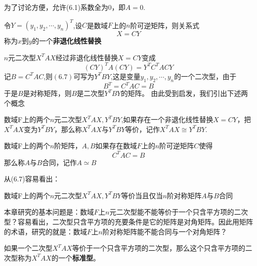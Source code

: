 \documentclass[lang=cn,10pt]{elegantbook}
\begin{document}
为了讨论方便，允许(6.1)系数全为0，即$A=0$.

令$Y=(y_{1},y_{2},\cdots,y_{n})^{T}$,设$C$是数域$F$上的$n$阶可逆矩阵，则关系式
\begin{equation}
	X=CY
\end{equation}
称为$x$到$y$的一个\textbf{非退化线性替换}

$n$元二次型$X^{T}AX$经过非退化线性替换$X=CY$变成
\begin{equation}
	(CY)^{T}A(CY)=Y^{T}C^{T}ACY
\end{equation}
记$B=C^{T}AC$,则$(6.7)$可写为$Y^{T}BY$,这是变量$y_{1},y_{2},\cdots,y_{n} $的一个二次型，由于
\begin{equation}
	B^{T}=C^{T}AC=B
\end{equation}
于是$B$是对称矩阵，则$B$是二次型$Y^{T}BY$的矩阵。
由此受到启发，我们引出下述两个概念
\begin{definition}
	数域F上的两个$n$元二次型$X^{T}AX,Y^{T}BY$,如果存在一个非退化线性替换$X=CY$，把$X^{T}AX$变为$Y^{T}BY$，那么称$X^{T}AX$与$Y^{T}BY$等价，记作$X^{T}AX\cong Y^{T}BY$.
\end{definition}
\begin{definition}
	数域F上的两个$n$阶矩阵，$A,B$如果存在数域$F$上的$n$阶可逆矩阵$C$使得
	\begin{equation}
		C^{T}AC=B
	\end{equation}
	那么称$A$与$B$合同，记作$A\simeq B$
\end{definition}
从(6.7)容易看出：

\begin{proposition}
	数域F上的两个$n$元二次型$X^{T}AX,Y^{T}BY$等价当且仅当$n$阶对称矩阵$A$与$B$合同
\end{proposition}
本章研究的基本问题是：数域$F$上$n$元二次型能不能等价于一个只含平方项的二次型？容易看出，二次型只含平方项的充要条件是它的矩阵是对角矩阵。因此用矩阵的术语，研究的就是：数域$F$上$n$阶对称矩阵能不能合同与一个对角矩阵？

如果一个二次型$X^{T}AX$等价于一个只含平方项的二次型，那么这个只含平方项的二次型称为$X^{T}AX$的一个\textbf{标准型}。
\end{document}
